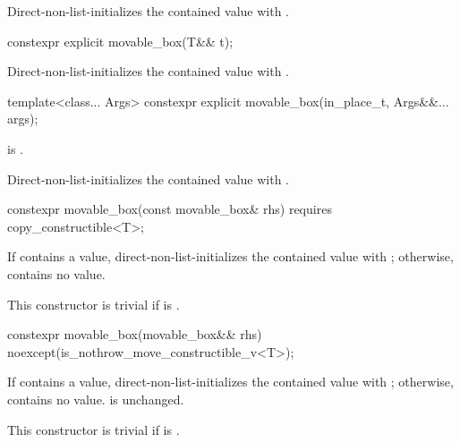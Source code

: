 \begin{itemdescr}
\pnum
\effects
Direct-non-list-initializes the contained value with .
\end{itemdescr}

%
\begin{itemdecl}
constexpr explicit movable_box(T&& t);
\end{itemdecl}

\begin{itemdescr}
\pnum
\effects
Direct-non-list-initializes the contained value with .
\end{itemdescr}

%
\begin{itemdecl}
template<class... Args> constexpr explicit movable_box(in_place_t, Args&&... args);
\end{itemdecl}

\begin{itemdescr}
\pnum
\constraints
{} is .

\pnum
\effects
Direct-non-list-initializes the contained value with .
\end{itemdescr}

%
\begin{itemdecl}
constexpr movable_box(const movable_box& rhs)
  requires copy_constructible<T>;
\end{itemdecl}

\begin{itemdescr}
\pnum
\effects
If  contains a value, direct-non-list-initializes the contained value with ; otherwise,  contains no value.

\pnum
\remarks
This constructor is trivial if  is .
\end{itemdescr}

%
\begin{itemdecl}
constexpr movable_box(movable_box&& rhs) noexcept(is_nothrow_move_constructible_v<T>);
\end{itemdecl}

\begin{itemdescr}
\pnum
\effects
If  contains a value, direct-non-list-initializes the contained value with ; otherwise,  contains no value.  is unchanged.

\pnum
\remarks
This constructor is trivial if  is .
\end{itemdescr}

